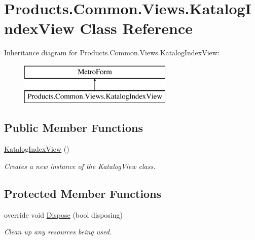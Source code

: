 \hypertarget{class_products_1_1_common_1_1_views_1_1_katalog_index_view}{}\section{Products.\+Common.\+Views.\+Katalog\+Index\+View Class Reference}
\label{class_products_1_1_common_1_1_views_1_1_katalog_index_view}
Inheritance diagram for Products.\+Common.\+Views.\+Katalog\+Index\+View\+:\begin{figure}[H]
\begin{center}
\leavevmode
\includegraphics[height=2.000000cm]{class_products_1_1_common_1_1_views_1_1_katalog_index_view}
\end{center}
\end{figure}
\subsection*{Public Member Functions}
\begin{DoxyCompactItemize}
\item 
\hyperlink{class_products_1_1_common_1_1_views_1_1_katalog_index_view_a2851b8d7c47c8145e486a4f17244b2eb}{Katalog\+Index\+View} ()
\begin{DoxyCompactList}\small\item\em Creates a new instance of the Katalog\+View class. \end{DoxyCompactList}\end{DoxyCompactItemize}
\subsection*{Protected Member Functions}
\begin{DoxyCompactItemize}
\item 
override void \hyperlink{class_products_1_1_common_1_1_views_1_1_katalog_index_view_a97873ba1a4dc55a34a19b836623e1bc2}{Dispose} (bool disposing)
\begin{DoxyCompactList}\small\item\em Clean up any resources being used. \end{DoxyCompactList}\end{DoxyCompactItemize}


